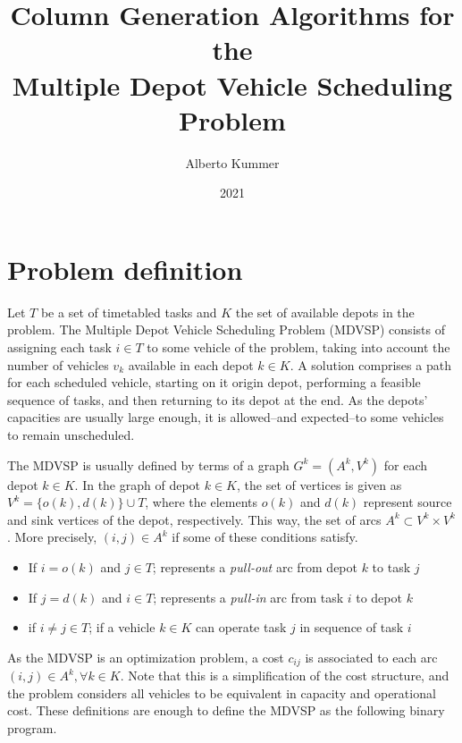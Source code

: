\documentclass{article}
\title{Column Generation Algorithms for the\\Multiple Depot Vehicle Scheduling Problem}
\author{Alberto Kummer}
\date{2021}
\begin{document}
\maketitle

\section{Problem definition}

Let $T$ be a set of timetabled tasks and $K$ the set of available depots in the problem. The Multiple Depot Vehicle Scheduling Problem (MDVSP) consists of assigning each task $i \in T$ to some vehicle of the problem, taking into account the number of vehicles $v_k$ available in each depot $k \in K$. A solution comprises a path for each scheduled vehicle, starting on it origin depot, performing a feasible sequence of tasks, and then returning to its depot at the end. As the depots' capacities are usually large enough, it is allowed--and expected--to some vehicles to remain unscheduled.

The MDVSP is usually defined by terms of a graph $G^k=(A^k, V^k)$ for each depot $k \in K$. In the graph of depot $k \in K$, the set of vertices is given as $V^k = \{o(k), d(k)\} \cup T$, where the elements $o(k)$ and $d(k)$ represent source and sink vertices of the depot, respectively. This way, the set of arcs $A^k \subset V^k \times V^k$. More precisely, $(i,j) \in A^k$ if some of these conditions satisfy.

\begin{itemize}
   \item If $i = o(k)$ and $j \in T$; represents a \textit{pull-out} arc from depot $k$ to task $j$
   \item If $j = d(k)$ and $i \in T$; represents a \textit{pull-in} arc from task $i$ to depot $k$
   \item if $i \neq j \in T$; if a vehicle $k \in K$ can operate task $j$ in sequence of task $i$
\end{itemize}

As the MDVSP is an optimization problem, a cost $c_{ij}$ is associated to each arc $(i,j) \in A^k, \forall k \in K$. Note that this is a simplification of the cost structure, and the problem considers all vehicles to be equivalent in capacity and operational cost. These definitions are enough to define the MDVSP as the following binary program.
\end{document}
